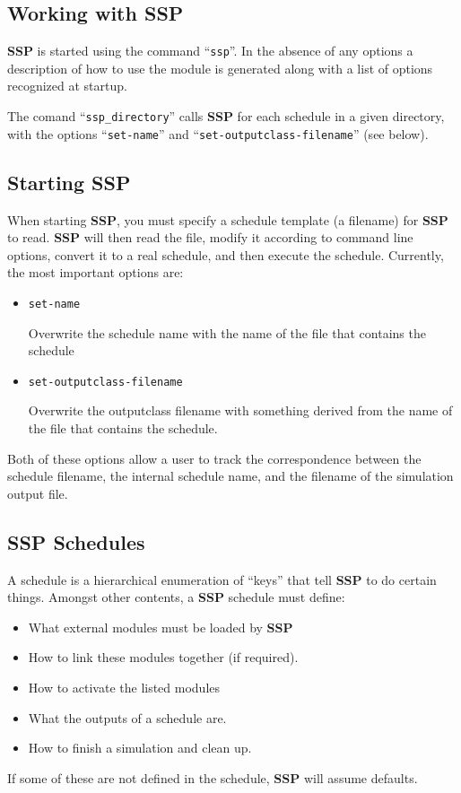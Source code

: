 \documentclass[12pt]{article}
\begin{document}
\subsection*{Working with SSP}

{\bf SSP} is started using the command ``{\tt ssp}''. In the absence of any options a description of how to use the module is generated along with a list of options recognized at startup.

The comand ``{\tt ssp\_directory}'' calls {\bf SSP} for each schedule in a given directory, with the options ``{\tt set-name}'' and ``{\tt set-outputclass-filename}'' (see below).

\subsection*{Starting SSP}

When starting {\bf SSP}, you must specify a schedule template (a filename) for {\bf SSP} to read. {\bf SSP} will then read the file, modify it according to command line options, convert it to a real schedule, and then execute the schedule. Currently, the most important options are:
\begin{itemize}
\item[ ]{\tt set-name}

Overwrite the schedule name with the name of the file that contains the schedule
\item[ ]{\tt set-outputclass-filename}

Overwrite the outputclass filename with something derived from the name of the file that contains the schedule.
\end{itemize}
Both of these options allow a user to track the correspondence between the schedule filename, the internal schedule name, and the filename of the simulation output file.

\subsection*{SSP Schedules}

A schedule is a hierarchical enumeration of ``keys'' that tell {\bf SSP} to do certain things. Amongst other contents, a {\bf SSP} schedule must define:
\begin{itemize}
\item What external modules must be loaded by {\bf SSP}
\item How to link these modules together (if required).
\item How to activate the listed modules
\item What the outputs of a schedule are.
\item How to finish a simulation and clean up.
\end{itemize}
If some of these are not defined in the schedule, {\bf SSP} will assume defaults.
\end{document}
